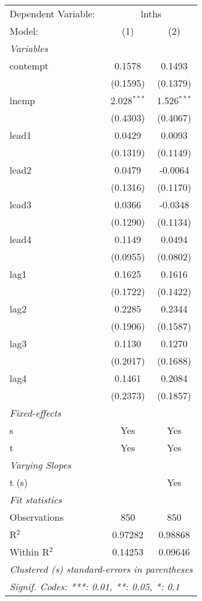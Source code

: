 \documentclass[
]{article}
\begin{document}
\begin{center}\begingroup\centering\begin{tabular}{lcc}   \tabularnewline \midrule \midrule   Dependent Variable: & \multicolumn{2}{c}{lnths}\\   Model:       & (1)           & (2)\\     \midrule   \emph{Variables}\\   contempt     & 0.1578        & 0.1493\\                   & (0.1595)      & (0.1379)\\      lnemp        & 2.028$^{***}$ & 1.526$^{***}$\\                   & (0.4303)      & (0.4067)\\      lead1        & 0.0429        & 0.0093\\                   & (0.1319)      & (0.1149)\\      lead2        & 0.0479        & -0.0064\\                   & (0.1316)      & (0.1170)\\      lead3        & 0.0366        & -0.0348\\                   & (0.1290)      & (0.1134)\\      lead4        & 0.1149        & 0.0494\\                   & (0.0955)      & (0.0802)\\      lag1         & 0.1625        & 0.1616\\                   & (0.1722)      & (0.1422)\\      lag2         & 0.2285        & 0.2344\\                   & (0.1906)      & (0.1587)\\      lag3         & 0.1130        & 0.1270\\                   & (0.2017)      & (0.1688)\\      lag4         & 0.1461        & 0.2084\\                   & (0.2373)      & (0.1857)\\      \midrule   \emph{Fixed-effects}\\   s            & Yes           & Yes\\     t            & Yes           & Yes\\     \midrule   \emph{Varying Slopes}\\   t (s)        &               & Yes\\     \midrule   \emph{Fit statistics}\\   Observations & 850           & 850\\     R$^2$        & 0.97282       & 0.98868\\     Within R$^2$ & 0.14253       & 0.09646\\     \midrule \midrule   \multicolumn{3}{l}{\emph{Clustered (s) standard-errors in parentheses}}\\   \multicolumn{3}{l}{\emph{Signif. Codes: ***: 0.01, **: 0.05, *: 0.1}}\\\end{tabular}\par\endgroup\end{center}
\end{document}

